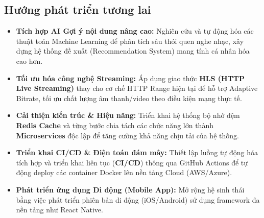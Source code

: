 \documentclass[a4paper,12pt]{article}
\begin{document}
\subsection{Hướng phát triển tương lai}
\begin{itemize}
    \item \textbf{Tích hợp AI Gợi ý nội dung nâng cao:} Nghiên cứu và tự động hóa các thuật toán Machine Learning để phân tích sâu thói quen nghe nhạc, xây dựng hệ thống đề xuất (Recommendation System) mang tính cá nhân hóa cao hơn.
    \item \textbf{Tối ưu hóa công nghệ Streaming:} Áp dụng giao thức \textbf{HLS (HTTP Live Streaming)} thay cho cơ chế HTTP Range hiện tại để hỗ trợ Adaptive Bitrate, tối ưu chất lượng âm thanh/video theo điều kiện mạng thực tế.
    \item \textbf{Cải thiện kiến trúc \& Hiệu năng:} Triển khai hệ thống bộ nhớ đệm \textbf{Redis Cache} và từng bước chia tách các chức năng lớn thành \textbf{Microservices} độc lập để tăng cường khả năng chịu tải của hệ thống.
    \item \textbf{Triển khai CI/CD \& Điện toán đám mây:} Thiết lập luồng tự động hóa tích hợp và triển khai liên tục (\textbf{CI/CD}) thông qua GitHub Actions để tự động deploy các container Docker lên nền tảng Cloud (AWS/Azure).
    \item \textbf{Phát triển ứng dụng Di động (Mobile App):} Mở rộng hệ sinh thái bằng việc phát triển phiên bản di động (iOS/Android) sử dụng framework đa nền tảng như React Native.
\end{itemize}
\end{document}
